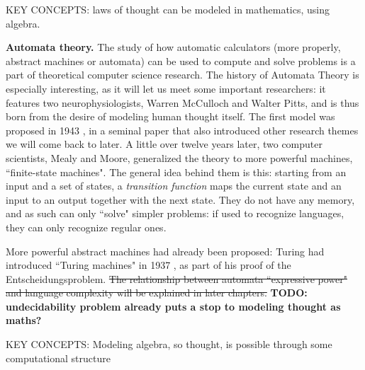 \documentclass[../main.tex]{subfiles}
\begin{document}
KEY CONCEPTS: laws of thought can be modeled in mathematics, using algebra.

\vspace{4pt}
\textbf{Automata theory.} The study of how automatic calculators (more properly, abstract machines or automata) can be used to compute and solve problems is a part of theoretical computer science research. The history of Automata Theory is especially interesting, as it will let us meet some important researchers: it features two neurophysiologists, Warren McCulloch and Walter Pitts, and is thus born from the desire of modeling human thought itself. The first model was proposed in 1943 \cite{mccullochLogicalCalculusIdeas1943}, in a seminal paper that also introduced other research themes we will come back to later. A little over twelve years later, two computer scientists, Mealy and Moore, generalized the theory to more powerful machines, ``finite-state machines". The general idea behind them is this: starting from an input and a set of states, a \textit{transition function} maps the current state and an input to an output together with the next state. They do not have any memory, and as such can only ``solve" simpler problems: if used to recognize languages, they can only recognize regular ones.

More powerful abstract machines had already been proposed: Turing had introduced ``Turing machines" in 1937 \cite{turingComputableNumbersApplication1937}, as part of his proof of the Entscheidungsproblem. \sout{The relationship between automata ``expressive power" and language complexity will be explained in later chapters.} \textbf{TODO: undecidability problem already puts a stop to modeling thought as maths?}

KEY CONCEPTS: Modeling algebra, so thought, is possible through some computational structure
\end{document}
